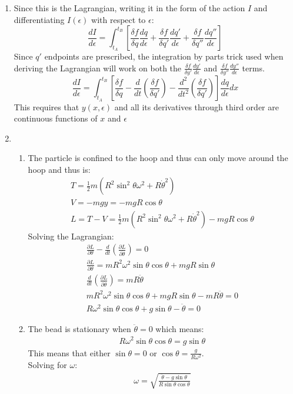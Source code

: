 \documentclass[12pt]{article}
\newcommand{\p}[2]{\frac{\partial #1}{\partial #2}}
\newcommand{\der}[2]{\frac{d #1}{d #2}}
\begin{document}
\begin{enumerate}
\begin{enumerate}
        \end{enumerate}
        \item Since this is the Lagrangian, writing it in the form of the action $I$ and differentiating $I(\epsilon)$ with respect to $\epsilon$:
        \[
            \frac{dI}{d\epsilon}=\int_{t_A}^{t_B}\left[\frac{\delta f}{\delta q}\frac{dq}{d\epsilon}+\frac{\delta f}{\delta q'}\frac{dq'}{d\epsilon}+\frac{\delta f}{\delta q''}\frac{dq''}{d\epsilon}\right]
        \]
        Since $q'$ endpoints are prescribed, the integration by parts trick used when deriving the Lagrangian will work on both the $\frac{\delta f}{\delta y'}\frac{dy'}{d\epsilon}$ and $\frac{\delta f}{\delta y''}\frac{dy''}{d\epsilon}$ terms.
        \[
            \frac{dI}{d\epsilon}=\int_{t_A}^{t_B}\left[\frac{\delta f}{\delta q}-\frac{d}{dt}\left(\frac{\delta f}{\delta q'}\right)-\frac{d^2}{dt^2}\left(\frac{\delta f}{\delta q'}\right)\right]\frac{dq}{d\epsilon}dx
        \]
        This requires that $y(x,\epsilon)$ and all its derivatives through third order are continuous functions of $x$ and $\epsilon$
        \item
        \begin{enumerate}
            \item The particle is confined to the hoop and thus can only move around the hoop and thus is:
            \begin{gather*}
                T=\frac{1}{2}m\left( R^2\sin^2\theta\omega^2+R\dot{\theta}^2 \right)\\
                V=-mgy=-mgR\cos\theta\\
                L=T-V=\frac{1}{2}m\left( R^2\sin^2\theta\omega^2+R\dot{\theta}^2 \right)-mgR\cos\theta
            \end{gather*}
            Solving the Lagrangian:
            \begin{gather*}
                \p{L}{\theta}-\der{}{t}\left( \p{L}{\dot{\theta}} \right)=0\\
                \p{L}{\theta}=mR^2 \omega^2\sin\theta\cos\theta+mgR\sin\theta\\
                \der{}{t}\left( \p{L}{\dot{\theta}} \right)=mR\ddot{\theta}\\
                mR^2 \omega^2\sin\theta\cos\theta+mgR\sin\theta-mR\ddot{\theta}=0\\
                R\omega^2\sin\theta\cos\theta+g\sin\theta-\ddot{\theta}=0
            \end{gather*}
            \item The bead is stationary when $\ddot{\theta}=0$ which means:
            \begin{gather*}
                R\omega^2\sin\theta\cos\theta=g\sin\theta
            \end{gather*}
            This means that either $\sin\theta=0$ or $\cos\theta=\frac{g}{R\omega^2}$.\\
            Solving for $\omega$:
            \begin{gather*}
                \omega=\sqrt{\frac{\ddot{\theta}-g\sin\theta}{R\sin\theta\cos\theta}}
            \end{gather*}
        \end{enumerate}

    \end{enumerate}
\end{document}
